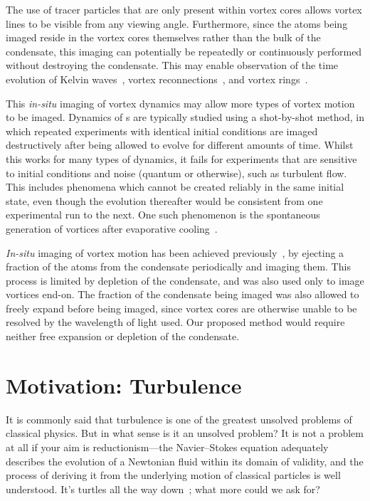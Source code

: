 The use of tracer particles that are only present within vortex cores allows vortex lines to be visible from any viewing angle.  Furthermore, since the atoms being imaged reside in the vortex cores themselves rather than the bulk of the condensate, this imaging can potentially be repeatedly or continuously performed without destroying the condensate. This may enable observation of the time evolution of Kelvin waves~\cite{bretin_quadrupole_2003}, vortex reconnections~\cite{leadbeater_sound_2001}, and vortex rings~\cite{anderson_watching_2001}.

This \emph{in-situ} imaging of vortex dynamics may allow more types of vortex motion to be imaged. Dynamics of \bec s are typically studied using a shot-by-shot method, in which repeated experiments with identical initial conditions are imaged destructively after being allowed to evolve for different amounts of time. Whilst this works for many types of dynamics, it fails for experiments that are sensitive to initial conditions and noise (quantum or otherwise), such as turbulent flow. This includes phenomena which cannot be created reliably in the same initial state, even though the evolution thereafter would be consistent from one experimental run to the next. One such phenomenon is the spontaneous generation of vortices after evaporative cooling~\cite{weiler_spontaneous_2008}.

\emph{In-situ} imaging of vortex motion has been achieved previously~\cite{freilich_real-time_2010}, by ejecting a fraction of the atoms from the condensate periodically and imaging them. This process is limited by depletion of the condensate, and was also used only to image vortices end-on. The fraction of the condensate being imaged was also allowed to freely expand before being imaged, since vortex cores are otherwise unable to be resolved by the wavelength of light used. Our proposed method would require neither free expansion or depletion of the condensate.

\section{Motivation: Turbulence}

It is commonly said that turbulence is one of the greatest unsolved problems of classical physics. But in what sense is it an unsolved problem? It is not a problem at all if your aim is reductionism---the Navier--Stokes equation adequately describes the evolution of a Newtonian fluid within its domain of validity, and the process of deriving it from the underlying motion of classical particles is well understood. It's turtles all the way down~\cite[p 1]{hawking_brief_1988}; what more could we ask for?


